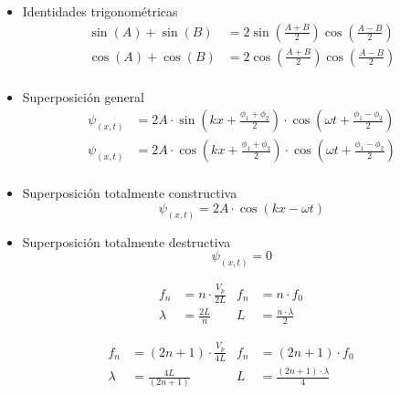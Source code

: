\vspace{0.25cm}
\begin{itemize}
    \item Identidades trigonométricas
    \begin{equation*}
        \begin{split}
            \sin(A) + \sin(B) &= 2 \sin\left(\frac{A+B}{2}\right)\cos\left(\frac{A-B}{2}\right)\\
            \cos(A) + \cos(B) &= 2 \cos\left(\frac{A+B}{2}\right)\cos\left(\frac{A-B}{2}\right)\\
        \end{split}
    \end{equation*}
    
    \item Superposición general 
    \begin{equation}
    \begin{split}
        \psi_{(x,t)} &= 2A \cdot \sin\left(kx + {\frac{\phi_1 +\phi_2}{2}}\right) \cdot \cos\left({\omega t+ \frac{\phi_1 - \phi_2}{2}}\right)\\
        \psi_{(x,t)} &= 2A \cdot \cos\left(kx + {\frac{\phi_1 +\phi_2}{2}}\right) \cdot \cos\left({\omega t+ \frac{\phi_1 - \phi_2}{2}}\right)\\
    \end{split}
    \end{equation}
    
    \item Superposición totalmente constructiva
    \begin{equation}
        \psi_{(x,t)} = 2A \cdot \cos\left({kx-\omega t}\right)
    \end{equation}
    
    \item Superposición totalmente destructiva
    \begin{equation}
        \psi_{(x,t)} = 0
    \end{equation}
\end{itemize}

\begin{align}
    f_n &= n \cdot \frac{V_p}{2L}   &  f_n &= n \cdot f_0 \\
    \lambda&=\frac{2L}{n}           &  L   &= \frac{n\cdot\lambda}{2}
\end{align}

\begin{align}
    f_n &= (2n+1) \cdot \frac{V_p}{4L}  &  f_n &= (2n+1) \cdot f_0 \\ 
    \lambda&=\frac{4L}{(2n+1)}          &  L   &= \frac{(2n+1)\cdot\lambda}{4}
\end{align}
